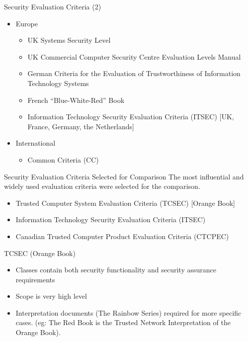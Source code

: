 \documentclass[xcolor=dvipsname,t]{beamer}
\begin{document}
\begin{frame} {Security Evaluation Criteria (2)}
    \begin{itemize}
        \item Europe
        \begin{itemize}
            \item UK Systems Security Level
            \item UK Commercial Computer Security Centre Evaluation
                  Levels Manual
            \item German Criteria for the Evaluation of Trustworthiness
                  of Information Technology Systems
            \item French ``Blue-White-Red'' Book
            \item Information Technology Security Evaluation Criteria (ITSEC)
                  [UK, France, Germany, the Netherlands]
        \end{itemize}
        \item International
        \begin{itemize}
            \item Common Criteria (CC)
        \end{itemize}
    \end{itemize}
\end{frame}

\begin{frame} {Security Evaluation Criteria Selected for Comparison}
    The most influential and widely used evaluation criteria were selected
    for the comparison.
    \begin{itemize}
        \item Trusted Computer System Evaluation Criteria (TCSEC) [Orange Book]
        \item Information Technology Security Evaluation Criteria (ITSEC)
        \item Canadian Trusted Computer Product Evaluation Criteria (CTCPEC)
    \end{itemize}
\end{frame}

\begin{frame} {TCSEC (Orange Book)}
    \begin{itemize}
        \item Classes contain both security functionality
              and security assurance requirements
        \item Scope is very high level
        \item Interpretation documents (The Rainbow Series)
              required for more specific cases. (eg: The Red Book
              is the Trusted Network Interpretation of the Orange Book).
    \end{itemize}
\end{frame}
\end{document}
